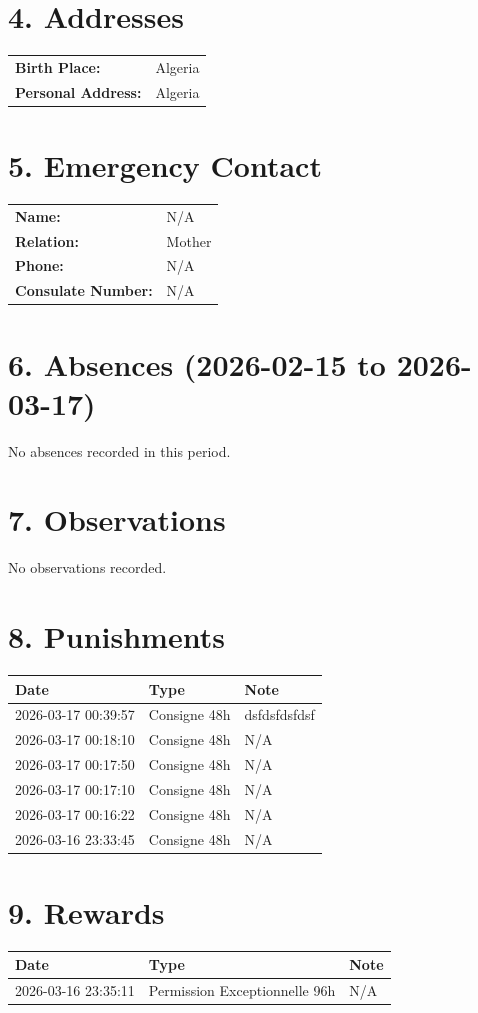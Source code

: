 \documentclass[a4paper,12pt]{article}
\begin{document}
\section*{4. Addresses}
\begin{tabular}{lp{10cm}}
\textbf{Birth Place:} & Algeria \\
\textbf{Personal Address:} & Algeria \\
\end{tabular}

\section*{5. Emergency Contact}
\begin{tabular}{lp{10cm}}
\textbf{Name:} & N/A \\
\textbf{Relation:} & Mother \\
\textbf{Phone:} & N/A \\
\textbf{Consulate Number:} & N/A \\
\end{tabular}

\section*{6. Absences (2026-02-15 to 2026-03-17)}
No absences recorded in this period.
\section*{7. Observations}
No observations recorded.
\section*{8. Punishments}
\begin{longtable}{lp{4cm}p{6cm}}
\hline \textbf{Date} & \textbf{Type} & \textbf{Note} \\ \hline
\endhead
2026-03-17 00:39:57 & Consigne 48h & dsfdsfdsfdsf \\
2026-03-17 00:18:10 & Consigne 48h & N/A \\
2026-03-17 00:17:50 & Consigne 48h & N/A \\
2026-03-17 00:17:10 & Consigne 48h & N/A \\
2026-03-17 00:16:22 & Consigne 48h & N/A \\
2026-03-16 23:33:45 & Consigne 48h & N/A \\
\hline
\end{longtable}

\section*{9. Rewards}
\begin{longtable}{lp{4cm}p{6cm}}
\hline \textbf{Date} & \textbf{Type} & \textbf{Note} \\ \hline
\endhead
2026-03-16 23:35:11 & Permission Exceptionnelle 96h & N/A \\
\hline
\end{longtable}
\end{document}
